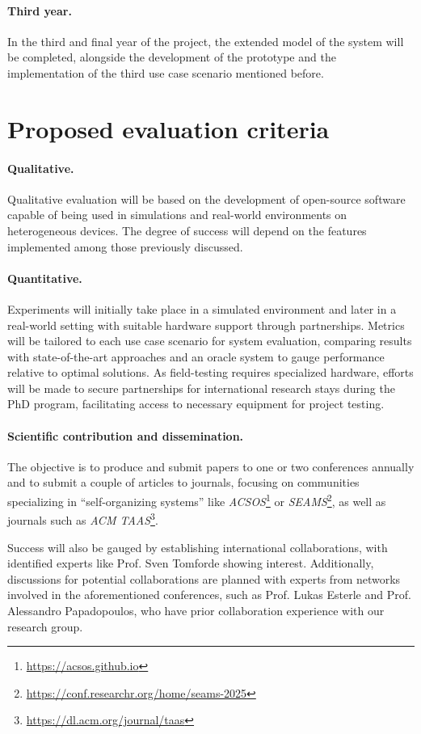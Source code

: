 \documentclass[12pt, a4paper]{article}
\begin{document}
\sloppypar
\paragraph{Third year.}
In the third and final year of the project,
the extended model of the system will be completed, alongside the development of the prototype
and the implementation of the third use case scenario mentioned before.

\section{Proposed evaluation criteria}
\label{sec:proposed-evaluation-criteria}

\sloppypar
\paragraph{Qualitative.}
Qualitative evaluation will be based on the development of open-source software capable of being used in simulations and real-world
environments on heterogeneous devices.
%
The degree of success will depend on the features implemented among those previously discussed.

\sloppypar
\paragraph{Quantitative.}
Experiments will initially take place in a simulated environment and later in a real-world setting with suitable
hardware support through partnerships.
%
Metrics will be tailored to each use case scenario for system evaluation,
comparing results with state-of-the-art approaches and an oracle system to gauge performance relative to optimal solutions.
%
As field-testing requires specialized hardware,
efforts will be made to secure partnerships for international research stays during the PhD program,
facilitating access to necessary equipment for project testing.

\sloppypar
\paragraph{Scientific contribution and dissemination.}
The objective is to produce and submit papers to one or two conferences annually and to submit a couple of articles to journals,
focusing on communities specializing in ``self-organizing systems'' like \emph{ACSOS}\footnote{\url{https://acsos.github.io}} or \emph{SEAMS}\footnote{\url{https://conf.researchr.org/home/seams-2025}},
as well as journals such as \emph{ACM TAAS}\footnote{\url{https://dl.acm.org/journal/taas}}.

Success will also be gauged by establishing international collaborations, with identified experts like Prof. Sven Tomforde showing interest.
%
Additionally,
discussions for potential collaborations are planned with experts from networks involved in the aforementioned conferences,
such as Prof. Lukas Esterle and Prof. Alessandro Papadopoulos,
who have prior collaboration experience with our research group.



\end{document}
